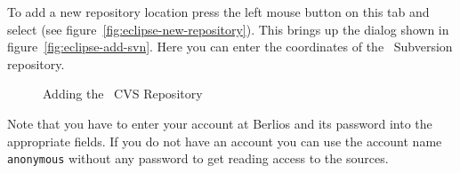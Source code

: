 To add a new repository location press the left mouse button on this
tab and select  (see
figure~\ref{fig:eclipse-new-repository}). This brings up the dialog
shown in figure~\ref{fig:eclipse-add-svn}. Here you can enter the
coordinates of the \ExTeX\ Subversion repository.
\begin{figure}[htp]
  \hbox{}\hfill
  \hfill
  \caption{Adding the \ExTeX\ CVS Repository}
\end{figure}

Note that you have to enter your account at Berlios and its password
into the appropriate fields. If you do not have an account you can use
the account name \texttt{anonymous} without any password to get
reading access to the sources.

